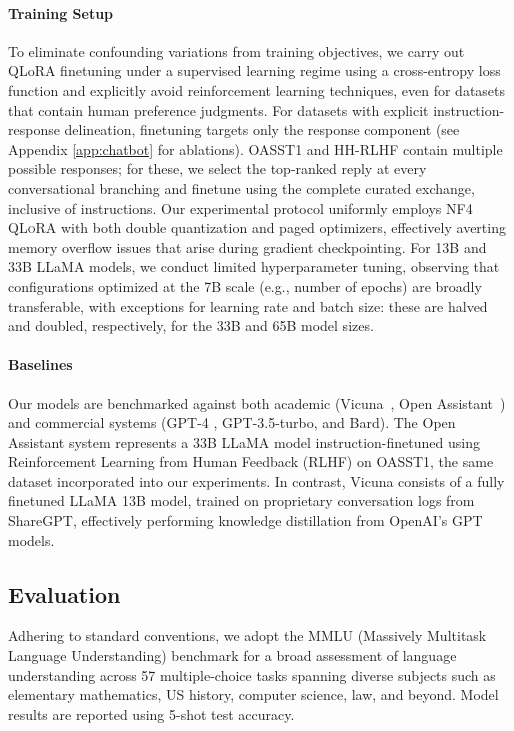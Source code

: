 \paragraph{Training Setup} To eliminate confounding variations from training objectives, we carry out QLoRA finetuning under a supervised learning regime using a cross-entropy loss function and explicitly avoid reinforcement learning techniques, even for datasets that contain human preference judgments. For datasets with explicit instruction-response delineation, finetuning targets only the response component (see Appendix \ref{app:chatbot} for ablations). OASST1 and HH-RLHF contain multiple possible responses; for these, we select the top-ranked reply at every conversational branching and finetune using the complete curated exchange, inclusive of instructions. Our experimental protocol uniformly employs NF4 \textsc{QLoRA} with both double quantization and paged optimizers, effectively averting memory overflow issues that arise during gradient checkpointing. For 13B and 33B LLaMA models, we conduct limited hyperparameter tuning, observing that configurations optimized at the 7B scale (e.g., number of epochs) are broadly transferable, with exceptions for learning rate and batch size: these are halved and doubled, respectively, for the 33B and 65B model sizes.

\paragraph{Baselines} Our models are benchmarked against both academic (Vicuna~\citep{vicuna2023}, Open Assistant~\citep{kopf2023openassistant}) and commercial systems (GPT-4 \citep{openai2023gpt}, GPT-3.5-turbo, and Bard). The Open Assistant system represents a 33B LLaMA model instruction-finetuned using Reinforcement Learning from Human Feedback (RLHF) on OASST1, the same dataset incorporated into our experiments. In contrast, Vicuna consists of a fully finetuned LLaMA 13B model, trained on proprietary conversation logs from ShareGPT, effectively performing knowledge distillation from OpenAI’s GPT models.

\subsection{Evaluation}

Adhering to standard conventions, we adopt the MMLU (Massively Multitask Language Understanding) benchmark \citep{hendrycksmeasuring} for a broad assessment of language understanding across 57 multiple-choice tasks spanning diverse subjects such as elementary mathematics, US history, computer science, law, and beyond. Model results are reported using 5-shot test accuracy.

